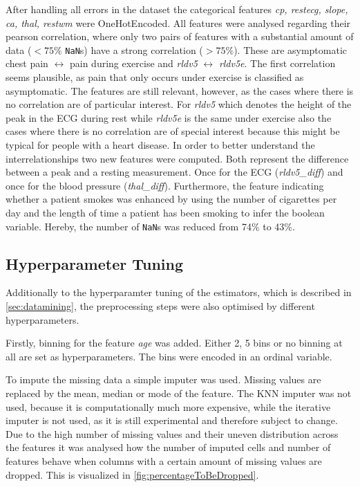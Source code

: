 After handling all errors in the dataset the categorical features \textit{cp, restecg, slope, ca, thal, restwm} were OneHotEncoded. All features were analysed regarding their pearson correlation, where only two pairs of features with a substantial amount of data ($<75\%$ \texttt{NaN}s) have a strong correlation ($>75\%$).  
These are asymptomatic chest pain $\leftrightarrow$ pain during exercise and \textit{rldv5} $\leftrightarrow$ \textit{rldv5e}. The first correlation seems plausible, as pain that only occurs under exercise is classified as asymptomatic. The features are still relevant, however, as the cases where there is no correlation are of particular interest. For \textit{rldv5} which denotes the height of the peak in the ECG during rest while \textit{rldv5e} is the same under exercise also the cases where there is no correlation are of special interest because this might be typical for people with a heart disease. In order to better understand the interrelationships two new features were computed. Both represent the difference between a peak and a resting measurement. Once for the ECG (\textit{rldv5\_diff}) and once for the blood pressure (\textit{thal\_diff}). 
Furthermore, the feature indicating whether a patient smokes was enhanced by using the number of cigarettes per day and the length of time a patient has been smoking to infer the boolean variable. Hereby, the number of \texttt{NaN}s was reduced from 74\% to 43\%. 

\subsection{Hyperparameter Tuning} \label{subsec:hyperparametertuning}
Additionally to the hyperparamter tuning of the estimators, which is described in \cref{sec:datamining}, the preprocessing steps were also optimised  by different hyperparameters.


Firstly, binning for the feature \textit{age} was added. Either 2, 5 bins or no binning at all are set as hyperparameters. The bins were encoded in an ordinal variable.

To impute the missing data a simple imputer was used. Missing values are replaced by the mean, median or mode of the feature. The KNN imputer was not used, because it is computationally much more expensive, while the iterative imputer is not used, as it is still experimental and therefore subject to change. Due to the high number of missing values and their uneven distribution across the features it was analysed how the number of imputed cells and number of features behave when columns with a certain amount of missing values are dropped. This is visualized in \cref{fig:percentageToBeDropped}.

